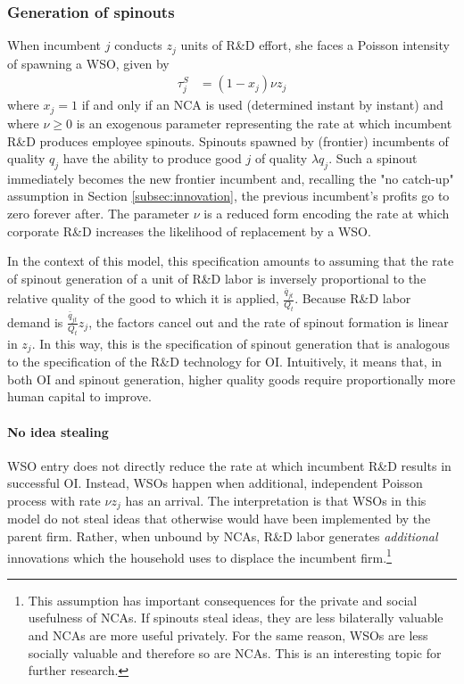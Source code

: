 \documentclass[11pt,english]{article}
\theoremstyle{remark}
\begin{document}
\subsubsection{Generation of spinouts}\label{subsubsec:generation_of_spinouts}

When incumbent $j$ conducts $z_j$ units of R\&D effort, she faces a Poisson intensity of spawning a WSO, given by 
\begin{align}
	\tau^S_j &= (1-x_{j}) \nu z_j \label{def:tau_S}
\end{align} 
where $x_{j} = 1$ if and only if an NCA is used (determined instant by instant) and where $\nu \ge 0$ is an exogenous parameter representing the rate at which incumbent R\&D produces employee spinouts. Spinouts spawned by (frontier) incumbents of quality $q_j$ have the ability to produce good $j$ of quality $\lambda q_j$. Such a spinout immediately becomes the new frontier incumbent and, recalling the "no catch-up" assumption in Section \ref{subsec:innovation}, the previous incumbent's profits go to zero forever after. The parameter $\nu$ is a reduced form encoding the rate at which corporate R\&D increases the likelihood of replacement by a WSO.

In the context of this model, this specification amounts to assuming that the rate of spinout generation of a unit of R\&D labor is inversely proportional to the relative quality of the good to which it is applied, $\frac{\bar{q}_{jt}}{Q_t}$. Because R\&D labor demand is $\frac{\bar{q}_{jt}}{Q_t} z_j$, the factors cancel out and the rate of spinout formation is linear in $z_j$. In this way, this is the specification of spinout generation that is analogous to the specification of the R\&D technology for OI. Intuitively, it means that, in both OI and spinout generation, higher quality goods require proportionally more human capital to improve.

\paragraph{No idea stealing} WSO entry does not directly reduce the rate at which incumbent R\&D results in successful OI. Instead, WSOs happen when additional, independent Poisson process with rate $\nu z_j$ has an arrival. The interpretation is that WSOs in this model do not steal ideas that otherwise would have been implemented by the parent firm. Rather, when unbound by NCAs, R\&D labor generates \textit{additional} innovations which the household uses to displace the incumbent firm.\footnote{This assumption has important consequences for the private and social usefulness of NCAs. If spinouts steal ideas, they are less bilaterally valuable and NCAs are more useful privately. For the same reason, WSOs are less socially valuable and therefore so are NCAs. This is an interesting topic for further research.}
\end{document}
